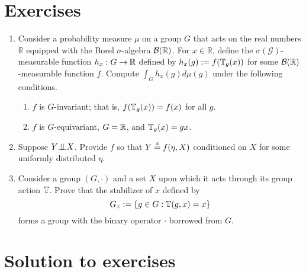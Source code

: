 

\section{Exercises}

\begin{enumerate}
	\item 
	Consider a probability measure $\mu$ on a group $G$ that acts on the real numbers $\mathbb{R}$ equipped with the Borel $\sigma$-algebra $\mathcal{B}(\mathbb{R})$.
	For $x \in \mathbb{R}$, define the $\sigma(\mathcal{G})$-measurable function $h_x: G \to \mathbb{R}$ defined by $h_x(g) := f(\mathbb{T}_g(x))$ for some $\mathcal{B}(\mathbb{R})$-measurable function $f$.
	Compute $\int_{G} h_x(g) d\mu(g)$ under the following conditions.
	\begin{enumerate}[label=(\alph*)]
		\item
		$f$ is $G$-invariant; that is, $f(\mathbb{T}_g(x)) = f(x)$ for all $g$.
		
		\item $f$ is $G$-equivariant, $G = \mathbb{R}$, and $\mathbb{T}_g(x) = gx$.
	\end{enumerate}
	
	\item
	Suppose $Y {\perp\!\!\!\perp} X$.
	Provide $f$ so that $Y \stackrel{\text{\rm\tiny d}}{=} f(\eta,X)$ conditioned on $X$ for some uniformly distributed $\eta$.
	
	\item Consider a group $(G, \cdot)$ and a set $X$ upon which it acts through its group action $\mathbb{T}$.
	Prove that the stabilizer of $x$ defined by
	$$
		G_x := \{ g \in G : \mathbb{T}(g,x) = x \}
	$$
	forms a group with the binary operator $\cdot$ borrowed from $G$.
\end{enumerate}

\pagebreak

\section{Solution to exercises}

